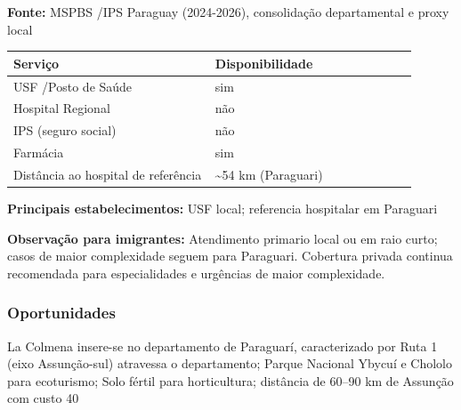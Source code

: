 \textbf{Fonte:} MSPBS /\allowbreak  IPS Paraguay (2024-2026), consolidação
departamental e proxy local

{\def\LTcaptype{none} %
\begin{longtable}{@{}>{\raggedright\arraybackslash}p{0.45\linewidth} >{\raggedright\arraybackslash}p{0.45\linewidth}@{}}
\toprule\noalign{}
Serviço & Disponibilidade \\
\midrule\noalign{}
\endhead
\bottomrule\noalign{}
\endlastfoot
USF /\allowbreak  Posto de Saúde & sim \\
Hospital Regional & não \\
IPS (seguro social) & não \\
Farmácia & sim \\
Distância ao hospital de referência & \textasciitilde54 km
(Paraguari) \\
\end{longtable}
}

\textbf{Principais estabelecimentos:} USF local; referencia hospitalar
em Paraguari

\textbf{Observação para imigrantes:} Atendimento primario local ou em
raio curto; casos de maior complexidade seguem para Paraguari. Cobertura
privada continua recomendada para especialidades e urgências de maior
complexidade.
\newpage

\subsubsection*{Oportunidades}\label{oport-la-colmena-0907}
La Colmena insere-se no departamento de Paraguarí, caracterizado por Ruta 1 (eixo Assunção-sul) atravessa o departamento; Parque Nacional Ybycuí e Chololo para ecoturismo; Solo fértil para horticultura; distância de 60–90 km de Assunção com custo 40%

